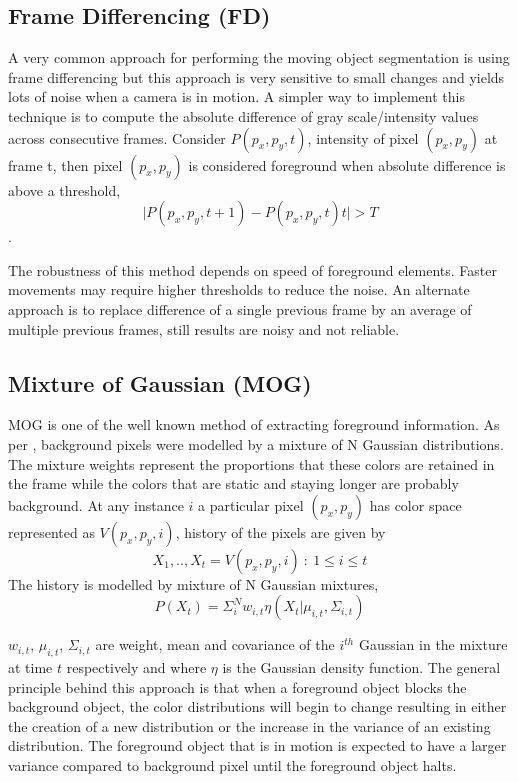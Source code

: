 \subsection{Frame Differencing (FD)}
A very common approach for performing the moving object segmentation is using frame differencing but this approach is very sensitive to small changes and yields lots of noise when a camera is in motion.  A simpler way to implement this technique is to compute the absolute difference of gray scale/intensity values across consecutive frames. Consider $P(p_x,p_y,t)$, intensity of pixel $(p_x,p_y)$ at frame t, then pixel $(p_x,p_y)$ is considered foreground when absolute difference is above a threshold,$$\vert P(p_x,p_y,t+1) - P(p_x,p_y,t)t\vert > T$$.
\par The robustness of this method depends on speed of foreground elements.  Faster movements may require higher thresholds to reduce the noise.   An alternate approach is to replace difference of a single previous frame  by an average of multiple previous frames, still results are noisy and not reliable.

\subsection{Mixture of Gaussian (MOG)}
MOG is one of the well known method of extracting foreground information.  As per \cite{kaew}, background pixels were modelled by a mixture of N Gaussian distributions.  The mixture weights represent the proportions that these colors are retained in the frame while the colors that are static and staying longer are probably background.  At any instance $i$ a particular pixel $(p_x,p_y)$ has color space represented as $V(p_{x},p_{y},i)$,  history of the pixels are given by 
$$X_{1},..,X_{t} = {V(p_{x},p_{y},i)~:~1\le i \le t }$$
The history is modelled by mixture of N Gaussian mixtures,
$$P(X_{t})=\Sigma_{i}^{N}w_{i,t}\eta(X_{t}|\mu_{i,t},\Sigma_{i,t})$$
\par $w_{i,t}$, $\mu_{i,t}$, $\Sigma_{i,t}$ are weight, mean and covariance of the $i^{th}$ Gaussian in the mixture at time $t$ respectively and where $\eta$ is the Gaussian density function.  The general principle behind this approach is that when a foreground object blocks the background object, the color distributions will begin to change resulting in either the creation of a new distribution or the increase in the variance of an existing distribution.  The foreground object that is in motion is expected to have a larger variance compared to background pixel until the foreground object halts.



